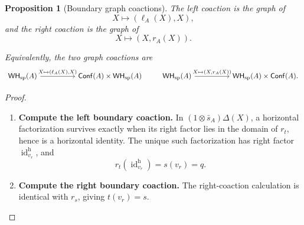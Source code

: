 \documentclass[oneside]{article}
\newcommand{\Conf}{\mathsf{Conf}}
\newcommand{\WH}{\mathsf{WH}}
\newcommand{\id}{\operatorname{id}}
\theoremstyle{plain}
\newtheorem{proposition}[theorem]{Proposition}
\theoremstyle{definition}
\theoremstyle{remark}
\begin{document}
\begin{proposition}[Boundary graph coactions]
\label{prop:cgqg-ps-coactions-boundary}
    The left coaction is the graph of
    \[
      X\longmapsto(\ell_A(X),X),
    \]
    and the right coaction is the graph of
    \[
      X\longmapsto(X,r_A(X)).
    \]

    Equivalently, the two graph coactions are
    \begin{equation*}
        \begin{tikzcd}[column sep=huge]
            \WH_{\mathrm{sp}}(A) \arrow[r,"{X\mapsto(\ell_A(X),X)}"] & \Conf(A)\times\WH_{\mathrm{sp}}(A)
        \end{tikzcd}
        \qquad
        \begin{tikzcd}[column sep=huge]
            \WH_{\mathrm{sp}}(A) \arrow[r,"{X\mapsto(X,r_A(X))}"] & \WH_{\mathrm{sp}}(A)\times \Conf(A).
        \end{tikzcd}
    \end{equation*}
\end{proposition}
\begin{proof}
    \leavevmode
    \begin{enumerate}[beginpenalty=10000]
        \item \textbf{Compute the left boundary coaction.} In \((1\otimes\bar s_A)\Delta(X)\), a horizontal factorization survives exactly when its right factor lies in the domain of \(r_t\), hence is a horizontal identity. The unique such factorization has right factor \(\id_{v_r}^{\mathrm h}\), and
        \[
            r_t(\id_{v_r}^{\mathrm h})=s(v_r)=q.
        \]
      
        \item \textbf{Compute the right boundary coaction.} The right-coaction calculation is identical with \(r_s\), giving \(t(v_r)=s\). \qedhere
    \end{enumerate}
\end{proof}
\end{document}
